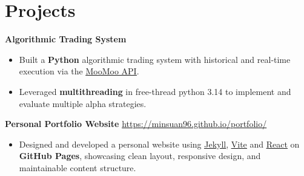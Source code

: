 \documentclass[11pt]{article}       %
\begin{document}

\vspace{-18.5pt}

\section*{Projects}
\textbf{Algorithmic Trading System} \\
\vspace{-9pt}
\begin{itemize}
  \item Built a \textbf{Python} algorithmic trading system with historical and real‑time execution via the \href{https://openapi.moomoo.com/moomoo-api-doc/en/intro/intro.html}{\underline{MooMoo API}}.
  \item Leveraged \textbf{multithreading} in free-thread python 3.14 to implement and evaluate multiple alpha strategies.
\end{itemize}

\textbf{Personal Portfolio Website} \hfill \href{https://minsuan96.github.io/portfolio/}{https://minsuan96.github.io/portfolio/} \\
\vspace{-9pt}
\begin{itemize}
  \item Designed and developed a personal website using \href{https://jekyllrb.com/}{\underline{Jekyll}}, \href{https://vite.dev/}{\underline{Vite}} and \href{https://react.dev/}{\underline{React}} on \textbf{GitHub Pages}, showcasing clean layout, responsive design, and maintainable content structure.
\end{itemize}


\end{document}

